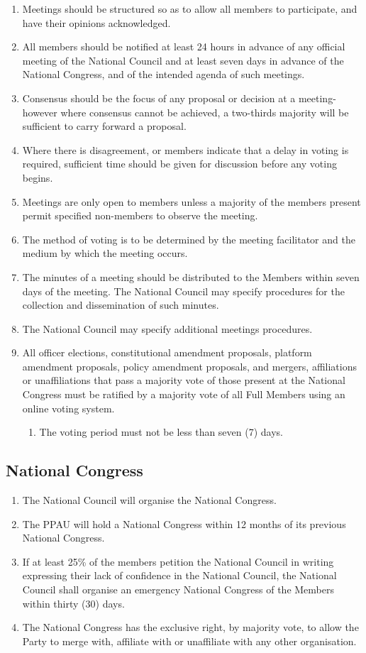 \documentclass[a4paper,titlepage,8.5pt]{article}
\begin{document}
\begin{enumerate}
\item Meetings should be structured so as to allow all members to participate, and have their opinions acknowledged.
\item All members should be notified at least 24 hours in advance of any official meeting of the National Council and at least seven days in advance of the National Congress, and of the intended agenda of such meetings.
\item Consensus should be the focus of any proposal or decision at a meeting- however where consensus cannot be achieved, a two-thirds majority will be sufficient to carry forward a proposal.
\item Where there is disagreement, or members indicate that a delay in voting is required, sufficient time should be given for discussion before any voting begins.
\item Meetings are only open to members unless a majority of the members present permit specified non-members to observe the meeting.  
\item The method of voting is to be determined by the meeting facilitator and the medium by which the meeting occurs.
\item The minutes of a meeting should be distributed to the Members within seven days of the meeting. The National Council may specify procedures for the collection and dissemination of such minutes.
\item The National Council may specify additional meetings procedures.
\item All officer elections, constitutional amendment proposals, platform amendment proposals, policy amendment proposals, and mergers, affiliations or unaffiliations that pass a majority vote of those present at the National Congress must be ratified by a majority vote of all Full Members using an online voting system.
\begin{enumerate}
\item The voting period must not be less than seven (7) days.
\end{enumerate}
\end{enumerate}

\subsection{National Congress}

\begin{enumerate}
\item The National Council will organise the National Congress.
\item The PPAU will hold a National Congress within 12 months of its previous National Congress.
\item If at least 25\% of the members petition the National Council in writing expressing their lack of confidence in the National Council, the National Council shall organise an emergency National Congress of the Members within thirty (30) days.
\item The National Congress has the exclusive right, by majority vote, to allow the Party to merge with, affiliate with or unaffiliate with any other organisation.
\end{enumerate}
\end{document}
